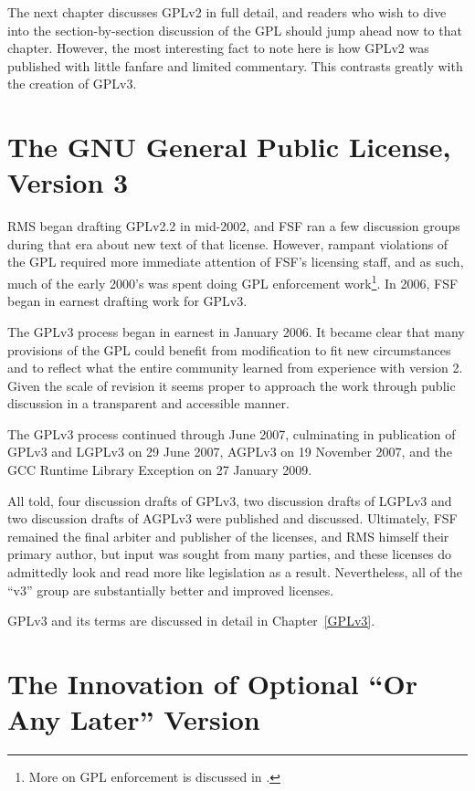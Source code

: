 The next chapter discusses GPLv2 in full detail, and readers who wish to dive
into the section-by-section discussion of the GPL should jump ahead now to
that chapter.  However, the most interesting fact to note here is how GPLv2
was published with little fanfare and limited commentary.  This contrasts
greatly with the creation of GPLv3.

\section{The GNU General Public License, Version 3}

RMS began drafting GPLv2.2 in mid-2002, and FSF ran a few discussion groups
during that era about new text of that license.  However, rampant violations
of the GPL required more immediate attention of FSF's licensing staff, and as
such, much of the early 2000's was spent doing GPL enforcement
work\footnote{More on GPL enforcement is discussed in .}.  In
2006, FSF began in earnest drafting work for GPLv3.

The GPLv3 process began in earnest in January 2006.  It became clear that
many provisions of the GPL could benefit from modification to fit new
circumstances and to reflect what the entire community learned from
experience with version 2.  Given the scale of revision it seems proper to
approach the work through public discussion in a transparent and accessible
manner.

The GPLv3 process continued through June 2007, culminating in publication of
GPLv3 and LGPLv3 on 29 June 2007, AGPLv3 on 19 November 2007, and the GCC
Runtime Library Exception on 27 January 2009.

All told, four discussion drafts of GPLv3, two discussion drafts of LGPLv3
and two discussion drafts of AGPLv3 were published and discussed.
Ultimately, FSF remained the final arbiter and publisher of the licenses, and
RMS himself their primary author, but input was sought from many parties, and
these licenses do admittedly look and read more like legislation as a result.
Nevertheless, all of the ``v3'' group are substantially better and improved
licenses.

GPLv3 and its terms are discussed in detail in Chapter~\ref{GPLv3}.

\section{The Innovation of Optional ``Or Any Later'' Version}

